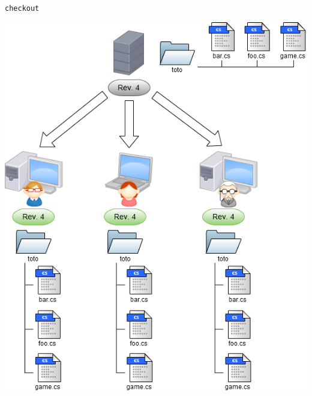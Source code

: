 \begin{frame}
  \texttt{checkout}
  \begin{center}
    \vspace{-12pt}
    \includegraphics[scale=0.3]{images/2-CheckOut.png}
  \end{center}
\end{frame}

